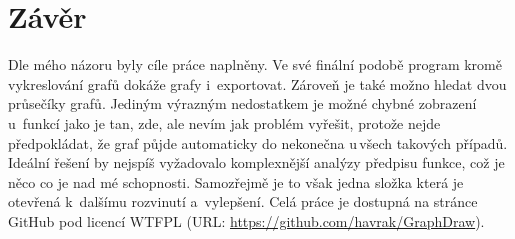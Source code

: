 \chapter*{Závěr}
Dle mého názoru byly cíle práce naplněny.
Ve své finální podobě program kromě vykreslování grafů dokáže grafy i~exportovat.
Zároveň je také možno hledat dvou průsečíky grafů.
Jediným výrazným nedostatkem je možné chybné zobrazení u~funkcí jako je tan, zde, ale nevím jak problém vyřešit, protože nejde předpokládat, že graf půjde automaticky do nekonečna u\,všech takových případů.
Ideální řešení by nejspíš vyžadovalo komplexnější analýzy předpisu funkce, což je něco co je nad mé schopnosti.
Samozřejmě je to však jedna složka která je otevřená k~dalšímu rozvinutí a~vylepšení.
Celá práce je dostupná na stránce GitHub pod licencí WTFPL (URL: \url{https://github.com/havrak/GraphDraw}).
